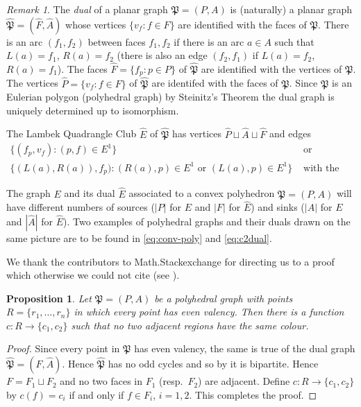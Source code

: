 \documentclass[12pt]{amsart}
\newtheorem{prop}[thm]{Proposition}
\theoremstyle{definition}
\theoremstyle{remark}
\newtheorem{rmk}[thm]{Remark}
\numberwithin{equation}{section}
\begin{document}
\begin{rmk} \label{rmk:dual}
The \emph{dual} of a planar graph $\mathfrak{P}=(P,A)$ is (naturally) a planar graph $\widehat{\mathfrak{P}}=(\hat{F},\hat{A})$ whose vertices $\{ v_f : f  \in F \}$ are identified with the faces of $\mathfrak{P}$. There is an arc $(f_1,f_2)$ between faces $f_1,f_2$ if there is an arc $a \in A$ such that $L(a)=f_1$, $R(a)=f_2$ (there is also an edge $(f_2,f_1)$ if $L(a)=f_2$, $R(a)=f_1$). The faces $\hat{F} = \{ f_p : p \in P \}$ of $\widehat{\mathfrak{P}}$ are identified with the vertices  of $\mathfrak{P}$. The vertices $\hat{P} = \{ v_f : f \in F \}$ of $\widehat{\mathfrak{P}}$ are identifed with the faces of $\mathfrak{P}$. Since $\mathfrak{P}$ is an Eulerian polygon (polyhedral graph) by Steinitz's Theorem \cite{St} the dual graph is uniquely determined up to isomorphism. 

The Lambek Quadrangle Club $\hat{E} $ of $\widehat{\mathfrak{P}}$ has vertices $\hat{P} \sqcup \hat{A} \sqcup\hat{F}$ and edges
\begin{align*}
\{ ( f_p , v_f ) : (p,f) \in E^1 \} & \text{ or } \\
\{ (L(a),R(a)),f_p) : (R(a),p) \in E^1 \text{ or } (L(a),p) \in E^1 \} & \text{ with the expected range and source maps.}
\end{align*}

\noindent
The graph $E$ and its dual $\hat{E}$ associated to a convex polyhedron $\mathfrak{P}=(P,A)$ will have different numbers of sources ($|P|$ for $E$ and $|F|$ for $\hat{E}$) and sinks ($|A|$ for $E$ and $|\hat{A}|$ for $\hat{E}$). Two examples of polyhedral graphs and their duals drawn on the same picture are to be found in \eqref{eq:conv-poly} and \eqref{eq:c2dual}.
\end{rmk}

\noindent
We thank the contributors to Math.Stackexchange for directing us to a proof which otherwise we could not cite (see \cite{MSt}).


\begin{prop} \label{prop:2-colour}
Let $\mathfrak{P} = (P,A)$ be a polyhedral graph with points $R = \{r_1 , \ldots , r_n \}$ in which every point has even valency. Then there is a function $c : R \to \{ c_1 , c_2 \}$ such that no two adjacent  regions have the same colour.
\end{prop}

\begin{proof}
Since every point in $\mathfrak{P}$ has even valency, the same is true of the dual graph $\widehat{\mathfrak{P}} = (F,\hat{A})$. Hence $\widehat{\mathfrak{P}}$ has no odd cycles and so by \cite[Proposition 1.6.1]{D} it is bipartite. Hence $F = F_1 \sqcup F_2$ and no two faces in $F_1$ (resp.\ $F_2$) are adjacent. Define $c : R \to \{ c_1 , c_2 \}$ by $c ( f ) = c_i$ if and only if $f \in F_i$, $i=1,2$. This completes the proof.
\end{proof}
\end{document}
